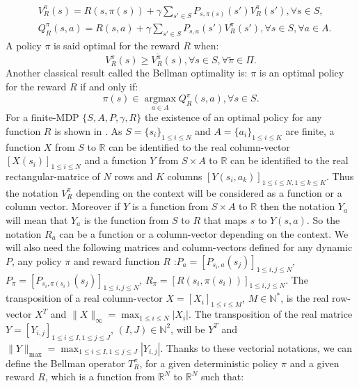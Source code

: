 \documentclass{llncs}
\newcommand{\argmax}{\operatorname*{argmax}}
\newcommand{\0}{\mathbf{0}}
\newcommand{\1}{\mathbf{1}}
\begin{document}
\begin{align}
\label{equation: Bellman}
&V^{\pi}_R(s)=R(s,\pi(s))+\gamma\sum_{s'\in S}P_{s,\pi(s)}(s')V^{\pi}_R(s'), \forall s\in S,
\\
&Q^{\pi}_R(s,a)=R(s,a)+\gamma\sum_{s'\in S}P_{s,a}(s')V^{\pi}_R(s'), \forall s\in S, \forall a\in A.
\end{align}
A policy $\pi$ is said optimal for the reward $R$ when:
\begin{equation}
\label{equation:Voptimal}
V^{\pi}_R(s)\geq V^{\tilde{\pi}}_R(s) , \forall s\in S, \forall \tilde{\pi}\in\Pi.
\end{equation}
Another classical result called the Bellman optimality is: $\pi$ is an optimal policy for the reward $R$ if and only if:
\begin{equation}
\label{equation:Qoptimal}
\pi(s)\in\argmax_{a\in A} Q^\pi_R(s,a), \forall s\in S.
\end{equation}
For a finite-MDP $\{S,A,P,\gamma,R\}$ the existence of an optimal policy for any function $R$ is shown in \cite{bertsekas2001dynamic}.
As $S=\{s_i\}_{1\leq i \leq N}$ and $A=\{a_i\}_{1\leq i \leq K}$ are finite, a function $X$ from $S$ to $\mathbb{R}$ can be identified to the real column-vector $[X(s_i)]_{1\leq i \leq N}$ and a function $Y$ from
$S\times A$ to $\mathbb{R}$ can be identified to the real rectangular-matrice of $N$ rows and $K$ columns  $[Y(s_i,a_k)]_{1\leq i \leq N, 1\leq k \leq K}$.
Thus the notation $V^\pi_R$ depending on the context will be considered as a function or a column vector. Moreover if $Y$ is a function from $S\times A$ to $\mathbb{R}$ then the notation $Y_a$ will mean that $Y_a$ is the function from $S$ to $R$ that maps $s$ to $Y(s,a)$. So the notation $R_a$ can be a function or a column-vector depending on the context.
We will also need the following matrices and column-vectors defined for any dynamic $P$, any policy $\pi$ and reward function $R$ :$P_a=[P_{s_i,a}(s_j)]_{1\leq i,j \leq N}$, $P_\pi=[P_{s_i,\pi(s_i)}(s_j)]_{1\leq i,j \leq N}$, $R_\pi=[R(s_i,\pi(s_i))]_{1\leq i,j \leq N}$. The transposition of a real column-vector $X=[X_i]_{1\leq i \leq M}$, $M\in\mathbb{N}^*$, is the real row-vector $X^T$ and $\|X\|_{\infty}=\max_{1\leq i \leq N}|X_i|$. The transposition of the real matrice $Y=[Y_{i,j}]_{1\leq i \leq I, 1\leq j \leq J}$, $(I,J)\in\mathbb{N}^2$, will be $Y^T$ and $\|Y\|_{\text{max}}=\max_{1\leq i \leq I,1\leq j \leq J}|Y_{i,j}|$.  Thanks to these vectorial notations, we can define the Bellman operator $T^\pi_R$, for a given deterministic policy $\pi$ and a given reward $R$, which is a function from $\mathbb{R}^N$ to $\mathbb{R}^N$ such that:
\end{document}
